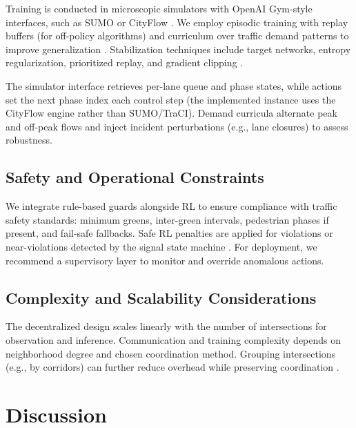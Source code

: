 \documentclass[12pt]{report} %
\begin{document}
Training is conducted in microscopic simulators with OpenAI Gym-style interfaces, such as SUMO or CityFlow \cite{SimulationPlatforms_Comparison2023,Lopez_2018,CityFlow_2019}. We employ episodic training with replay buffers (for off-policy algorithms) and curriculum over traffic demand patterns to improve generalization \cite{Curriculum_TSC_2023,MetaTraffic2023}. Stabilization techniques include target networks, entropy regularization, prioritized replay, and gradient clipping \cite{DeepTraffic2023,MARL_Coordinated_Access2023}.

The simulator interface retrieves per-lane queue and phase states, while actions set the next phase index each control step (the implemented instance uses the CityFlow engine rather than SUMO/TraCI). Demand curricula alternate peak and off-peak flows and inject incident perturbations (e.g., lane closures) to assess robustness.

\section{Safety and Operational Constraints}

We integrate rule-based guards alongside RL to ensure compliance with traffic safety standards: minimum greens, inter-green intervals, pedestrian phases if present, and fail-safe fallbacks. Safe RL penalties are applied for violations or near-violations detected by the signal state machine \cite{Du_2023}. For deployment, we recommend a supervisory layer to monitor and override anomalous actions.

\section{Complexity and Scalability Considerations}

The decentralized design scales linearly with the number of intersections for observation and inference. Communication and training complexity depends on neighborhood degree and chosen coordination method. Grouping intersections (e.g., by corridors) can further reduce overhead while preserving coordination \cite{GPLight_IJCAI2023,HierLight_2023}.



\chapter{Discussion}
\end{document}
